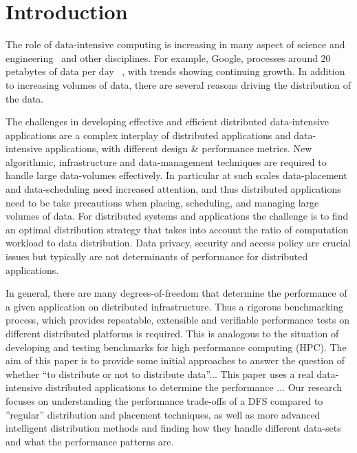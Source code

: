 \documentclass{rspublic}
\begin{document}

\section{Introduction} 

The role of data-intensive computing is increasing in many aspect of
science and engineering~\cite{fourthparadigm} and other
disciplines. For example, Google, processes around 20 petabytes of
data per day ~\citep{google}, with trends showing continuing
growth. In addition to increasing volumes of data, there are several
reasons driving the distribution of the data.

The challenges in developing effective and efficient distributed
data-intensive applications are a complex interplay of distributed
applications and data-intensive applications, with different design \&
performance metrics. New algorithmic, infrastructure and
data-management techniques are required to handle large data-volumes
effectively.  In particular at such scales data-placement and
data-scheduling need increased attention, and thus distributed
applications need to be take precautions when placing, scheduling, and
managing large volumes of data.  For distributed systems and
applications the challenge is to find an optimal distribution strategy
that takes into account the ratio of computation workload to data
distribution. Data privacy, security and access policy are crucial
issues but typically are not determinants of performance for
distributed applications.


In general, there are many degrees-of-freedom that determine the
performance of a given application on distributed infrastructure. Thus
a rigorous benchmarking process, which provides repeatable, extensible
and verifiable performance tests on different distributed platforms is
required.  This is analogous to the situation of developing and
testing benchmarks for high performance computing (HPC).  The aim of
this paper is to provide some initial approaches to answer the
question of whether ``to distribute or not to distribute data''...
This paper uses a real data-intensive distributed applications to
determine the performance ... Our research focuses on understanding
the performance trade-offs of a DFS compared to ''regular''
distribution and placement techniques, as well as more advanced
intelligent distribution methods and finding how they handle different
data-sets and what the performance patterns are.
\end{document}
